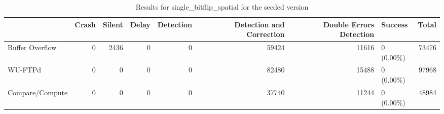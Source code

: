 \begin{table}[t]
	\centering
	\caption{Results for single_bitflip_spatial for the secded version}
	\label{table:end_sim_by_status_secded_1_single_bitflip_spatial}
	\begin{tabular}{lrrrrrrlr}
		\toprule
		                & Crash & Silent & Delay & Detection & Detection and Correction & Double Errors Detection & Success    & Total \\
		\midrule
		Buffer Overflow & 0     & 2436   & 0     & 0         & 59424                    & 11616                   & 0 (0.00\%) & 73476 \\
		WU-FTPd         & 0     & 0      & 0     & 0         & 82480                    & 15488                   & 0 (0.00\%) & 97968 \\
		Compare/Compute & 0     & 0      & 0     & 0         & 37740                    & 11244                   & 0 (0.00\%) & 48984 \\
		\bottomrule
	\end{tabular}
\end{table}
